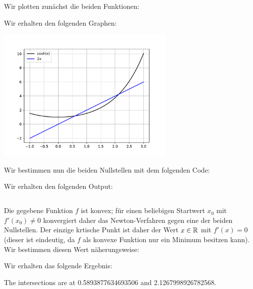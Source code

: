 \section{}



\subsection{}

Wir plotten zunächst die beiden Funktionen:



Wir erhalten den folgenden Graphen:

\begin{center}
  \includegraphics[width = 0.65\textwidth]{chapter_04/exercise_04_15_figure.pdf}
\end{center}

Wir bestimmen nun die beiden Nullstellen mit dem folgenden Code:



Wir erhalten den folgenden Output:




\subsection{}

Die gegebene Funktion $f$ ist konvex;
für einen beliebigen Startwert $x_0$ mit $f'(x_0) $ konvergiert daher das Newton-Verfahren gegen eine der beiden Nullstellen.
Der einzige krtische Punkt ist daher der Wert $x \in \mathbb{R}$ mit $f'(x) = 0$ (dieser ist eindeutig, da $f$ als konvexe Funktion nur ein Minimum besitzen kann).
Wir bestimmen diesen Wert näherungsweise:



Wir erhalten das folgende Ergebnis:

\begin{consoleoutput}
  The intersections are at 0.5893877634693506 and 2.1267998926782568.
\end{consoleoutput}
